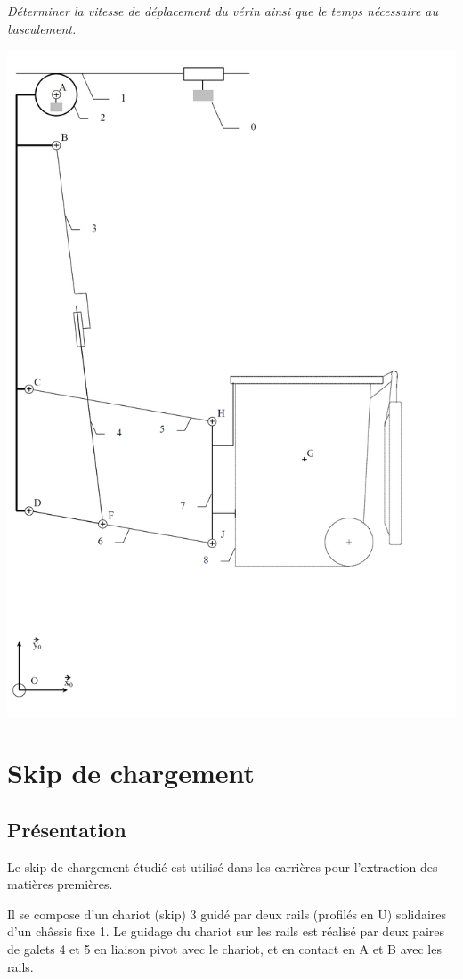 \documentclass[10pt]{article}
\begin{document}
\subparagraph{}
\textit{Déterminer la vitesse de déplacement du vérin ainsi que le temps nécessaire au basculement.}

\begin{center}
\includegraphics[width=.8\textwidth]{images/fig_05}
\end{center}


\newpage
\section*{Skip de chargement}
\setcounter{subparagraph}{0}
\subsection*{Présentation}

Le skip de chargement étudié est utilisé dans les carrières pour l’extraction 
des matières premières. 
 
Il se compose d’un chariot (skip) 3 guidé par deux rails (profilés en U) 
solidaires d’un châssis fixe 1. 
Le guidage du chariot sur les rails est réalisé par deux paires de galets 4 et 5 
en liaison pivot avec le chariot, et en contact en A et B avec les rails. 
 
\end{document}
